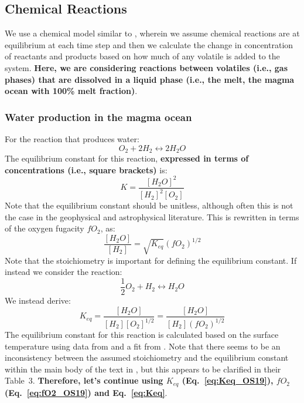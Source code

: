\subsection{Chemical Reactions}
We use a chemical model similar to \cite{GS14}, wherein we assume chemical reactions are at equilibrium at each time step and then we calculate the change in concentration of reactants and products based on how much of any volatile is added to the system.  \textbf{Here, we are considering reactions between volatiles (i.e., gas phases) that are dissolved in a liquid phase (i.e., the melt, the magma ocean with 100\% melt fraction)}.
\subsubsection{Water production in the magma ocean}
For the reaction that produces water:
\begin{equation}
    {O_2} + 2H_2 \leftrightarrow 2H_2O
    \label{eq:altreaction} 
\end{equation}
The equilibrium constant for this reaction, \textbf{expressed in terms of concentrations (i.e., square brackets)} is:
\begin{equation}
    K = \frac{[H_2O]^2}{[H_2]^2[O_2]}
\end{equation}
Note that the equilibrium constant should be unitless, although often this is not the case in the geophysical and astrophysical literature.
This is rewritten in terms of the oxygen fugacity $fO_2$, as: 
\begin{equation}
    \frac{[H_2O]}{[H_2]} = \sqrt{K_{eq}} \left(fO_2\right)^{1/2}
\end{equation}
Note that the stoichiometry is important for defining the equilibrium constant.  If instead we consider the reaction:
\begin{equation}
    \frac{1}{2} O_2 + H_2 \leftrightarrow H_2O
    \label{eq:reaction}
\end{equation}
We instead derive:
\begin{equation}
     K_{eq} = \frac{[H_2O]}{[H_2] [O_2]^{1/2}} = \frac{[H_2O]}{[H_2] \left(fO_2\right)^{1/2}}
    \label{eq:Keq}
\end{equation}
The equilibrium constant for this reaction is calculated based on the surface temperature using data from \cite{RBF78} and a fit from \cite{OS19}.  Note that there seems to be an inconsistency between the assumed stoichiometry and the equilibrium constant within the main body of the text in \cite{OS19}, but this appears to be clarified in their Table~3.  \textbf{Therefore, let's continue using $K_{eq}$ (Eq.~\ref{eq:Keq_OS19}), $fO_2$ (Eq.~\ref{eq:fO2_OS19}) and Eq.~\ref{eq:Keq}}.
